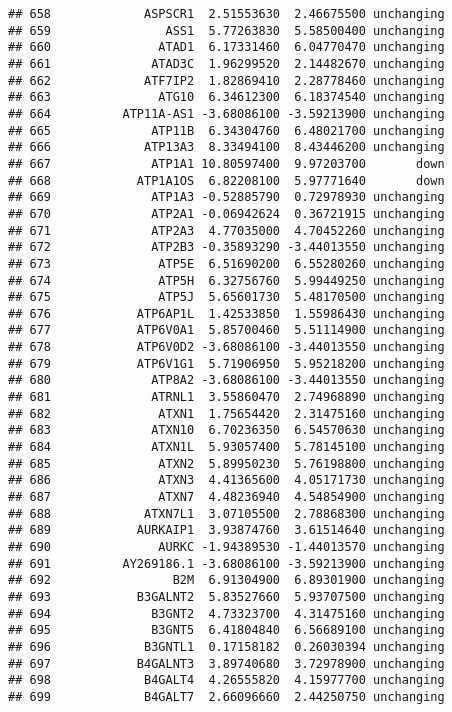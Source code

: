 \documentclass[]{article}
\begin{document}
\begin{verbatim}
## 658             ASPSCR1  2.51553630  2.46675500 unchanging
## 659                ASS1  5.77263830  5.58500400 unchanging
## 660               ATAD1  6.17331460  6.04770470 unchanging
## 661              ATAD3C  1.96299520  2.14482670 unchanging
## 662             ATF7IP2  1.82869410  2.28778460 unchanging
## 663               ATG10  6.34612300  6.18374540 unchanging
## 664          ATP11A-AS1 -3.68086100 -3.59213900 unchanging
## 665              ATP11B  6.34304760  6.48021700 unchanging
## 666             ATP13A3  8.33494100  8.43446200 unchanging
## 667              ATP1A1 10.80597400  9.97203700       down
## 668            ATP1A1OS  6.82208100  5.97771640       down
## 669              ATP1A3 -0.52885790  0.72978930 unchanging
## 670              ATP2A1 -0.06942624  0.36721915 unchanging
## 671              ATP2A3  4.77035000  4.70452260 unchanging
## 672              ATP2B3 -0.35893290 -3.44013550 unchanging
## 673               ATP5E  6.51690200  6.55280260 unchanging
## 674               ATP5H  6.32756760  5.99449250 unchanging
## 675               ATP5J  5.65601730  5.48170500 unchanging
## 676            ATP6AP1L  1.42533850  1.55986430 unchanging
## 677            ATP6V0A1  5.85700460  5.51114900 unchanging
## 678            ATP6V0D2 -3.68086100 -3.44013550 unchanging
## 679            ATP6V1G1  5.71906950  5.95218200 unchanging
## 680              ATP8A2 -3.68086100 -3.44013550 unchanging
## 681              ATRNL1  3.55860470  2.74968890 unchanging
## 682               ATXN1  1.75654420  2.31475160 unchanging
## 683              ATXN10  6.70236350  6.54570630 unchanging
## 684              ATXN1L  5.93057400  5.78145100 unchanging
## 685               ATXN2  5.89950230  5.76198800 unchanging
## 686               ATXN3  4.41365600  4.05171730 unchanging
## 687               ATXN7  4.48236940  4.54854900 unchanging
## 688             ATXN7L1  3.07105500  2.78868300 unchanging
## 689            AURKAIP1  3.93874760  3.61514640 unchanging
## 690               AURKC -1.94389530 -1.44013570 unchanging
## 691          AY269186.1 -3.68086100 -3.59213900 unchanging
## 692                 B2M  6.91304900  6.89301900 unchanging
## 693            B3GALNT2  5.83527660  5.93707500 unchanging
## 694              B3GNT2  4.73323700  4.31475160 unchanging
## 695              B3GNT5  6.41804840  6.56689100 unchanging
## 696             B3GNTL1  0.17158182  0.26030394 unchanging
## 697            B4GALNT3  3.89740680  3.72978900 unchanging
## 698             B4GALT4  4.26555820  4.15977700 unchanging
## 699             B4GALT7  2.66096660  2.44250750 unchanging

\end{verbatim}
\end{document}
